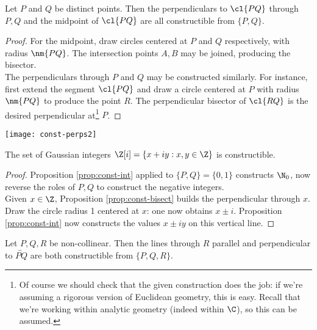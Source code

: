 \begin{prop}\label{prop:const-bisect}
Let $P$ and $Q$ be distinct points. Then the perpendiculars to $\cl{PQ}$ through $P,Q$ and the midpoint of $\cl{PQ}$ are all constructible from $\{P,Q\}$.
\end{prop}

\begin{proof}
For the midpoint, draw circles centered at $P$ and $Q$ respectively, with radius $\nm{PQ}$. The intersection points $A,B$ may be joined, producing the bisector.\\
The perpendiculars through $P$ and $Q$ may be constructed similarly. For instance, first extend the segment $\cl{PQ}$ and draw a circle centered at $P$ with radius $\nm{PQ}$ to produce the point $R$. The perpendicular bisector of $\cl{RQ}$ is the desired perpendicular at\footnote{Of course we should check that the given construction does the job: if we're assuming a rigorous version of Euclidean geometry, this is easy. Recall that we're working within analytic geometry (indeed within $\C$), so this can be assumed.} $P$.
\end{proof}

\begin{center}
\qquad\qquad \texttt{[image: const-perps2]}
\end{center}

\begin{cor}
The set of Gaussian integers $\Z[i]=\{x+iy:x,y\in\Z\}$ is constructible.
\end{cor}

\begin{proof}
Proposition \ref{prop:const-int} applied to $\{P,Q\}=\{0,1\}$ constructs $\N_0$, now reverse the roles of $P,Q$ to construct the negative integers.\\
Given $x\in\Z$, Proposition \ref{prop:const-bisect} builds the perpendicular through $x$. Draw the circle radius 1 centered at $x$: one now obtains $x\pm i$. Proposition \ref{prop:const-int} now constructs the values $x\pm iy$ on this vertical line.
\end{proof}\pagebreak

\begin{prop}\label{prop:const-zbar}
Let $P,Q,R$ be non-collinear. Then the lines through $R$ parallel and perpendicular to $\overleftrightarrow{PQ}$ are both constructible from $\{P,Q,R\}$.
\end{prop}

